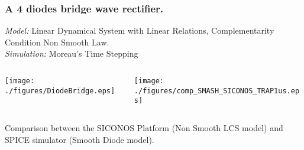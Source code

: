 \frame
{
  \frametitle{A 4 diodes bridge wave rectifier.}
  \emph{Model:} Linear Dynamical System with Linear Relations, Complementarity Condition Non Smooth Law. \\
  \emph{Simulation:} Moreau's Time Stepping
  \begin{columns}
    \begin{column}[t]{6cm}
      \begin{center}
        \texttt{[image: ./figures/DiodeBridge.eps]}
      \end{center}
    \end{column}
    \begin{column}[t]{6cm}
      \begin{center}  
        \texttt{[image: ./figures/comp\_SMASH\_SICONOS\_TRAP1us.eps]}
      \end{center}
    \end{column}
  \end{columns}
  Comparison between the SICONOS Platform (Non Smooth LCS model) and SPICE simulator (Smooth Diode model). \\
}


